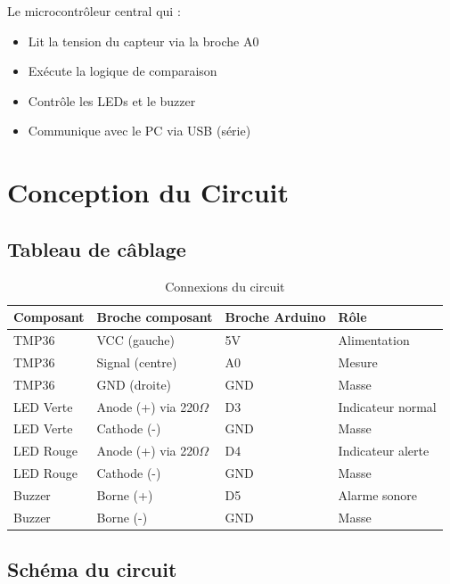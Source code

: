 \documentclass[12pt, a4paper]{article}
\begin{document}
Le microcontrôleur central qui :
\begin{itemize}
    \item Lit la tension du capteur via la broche A0
    \item Exécute la logique de comparaison
    \item Contrôle les LEDs et le buzzer
    \item Communique avec le PC via USB (série)
\end{itemize}

\section{Conception du Circuit}

\subsection{Tableau de câblage}

\begin{table}[H]
    \centering
    \caption{Connexions du circuit}
    \begin{tabular}{llll}
        \toprule
        \textbf{Composant} & \textbf{Broche composant} & \textbf{Broche Arduino} & \textbf{Rôle} \\
        \midrule
        TMP36 & VCC (gauche) & 5V & Alimentation \\
        TMP36 & Signal (centre) & A0 & Mesure \\
        TMP36 & GND (droite) & GND & Masse \\
        LED Verte & Anode (+) via 220$\Omega$ & D3 & Indicateur normal \\
        LED Verte & Cathode (-) & GND & Masse \\
        LED Rouge & Anode (+) via 220$\Omega$ & D4 & Indicateur alerte \\
        LED Rouge & Cathode (-) & GND & Masse \\
        Buzzer & Borne (+) & D5 & Alarme sonore \\
        Buzzer & Borne (-) & GND & Masse \\
        \bottomrule
    \end{tabular}
\end{table}

\subsection{Schéma du circuit}
\end{document}
